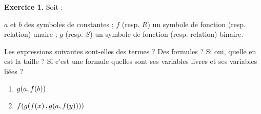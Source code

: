 \documentclass[a4paper,french,bookmarks]{book}
\begin{document}
    \textbf{Exercice 1.} Soit :
    \begin{enumerate}
        \itt $a$ et $b$ des symboles de constantes ;
        \itt $f$ (resp. $R$) un symbole de fonction (resp. relation) unaire ;
        \itt $g$ (resp. $S$) un symbole de fonction (resp. relation) binaire.
    \end{enumerate}
    
    Les expressions suivantes sont-elles des termes ? Des formules ? Si oui, quelle en est la taille ? Si c'est une formule quelles sont ses variables livres et ses variables liées ?
    
    \begin{enumerate}
        \item $g\!\left(a, f\!\left(b\right)\right)$
        
        \item $f\!\left(g\!\left(f\!\left(x\right), g\!\left(a, f\!\left(y\right)\right)\right)\right)$
    \end{enumerate}
    
\end{document}
